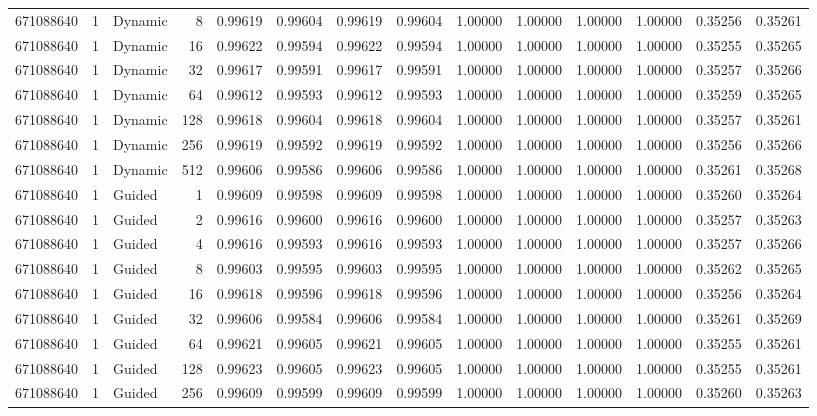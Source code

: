 \begin{tabular}{rrlrrrrrrrrrrr}
671088640 & 1 & Dynamic & 8 & 0.99619 & 0.99604 & 0.99619 & 0.99604 & 1.00000 & 1.00000 & 1.00000 & 1.00000 & 0.35256 & 0.35261 \\
671088640 & 1 & Dynamic & 16 & 0.99622 & 0.99594 & 0.99622 & 0.99594 & 1.00000 & 1.00000 & 1.00000 & 1.00000 & 0.35255 & 0.35265 \\
671088640 & 1 & Dynamic & 32 & 0.99617 & 0.99591 & 0.99617 & 0.99591 & 1.00000 & 1.00000 & 1.00000 & 1.00000 & 0.35257 & 0.35266 \\
671088640 & 1 & Dynamic & 64 & 0.99612 & 0.99593 & 0.99612 & 0.99593 & 1.00000 & 1.00000 & 1.00000 & 1.00000 & 0.35259 & 0.35265 \\
671088640 & 1 & Dynamic & 128 & 0.99618 & 0.99604 & 0.99618 & 0.99604 & 1.00000 & 1.00000 & 1.00000 & 1.00000 & 0.35257 & 0.35261 \\
671088640 & 1 & Dynamic & 256 & 0.99619 & 0.99592 & 0.99619 & 0.99592 & 1.00000 & 1.00000 & 1.00000 & 1.00000 & 0.35256 & 0.35266 \\
671088640 & 1 & Dynamic & 512 & 0.99606 & 0.99586 & 0.99606 & 0.99586 & 1.00000 & 1.00000 & 1.00000 & 1.00000 & 0.35261 & 0.35268 \\
671088640 & 1 & Guided & 1 & 0.99609 & 0.99598 & 0.99609 & 0.99598 & 1.00000 & 1.00000 & 1.00000 & 1.00000 & 0.35260 & 0.35264 \\
671088640 & 1 & Guided & 2 & 0.99616 & 0.99600 & 0.99616 & 0.99600 & 1.00000 & 1.00000 & 1.00000 & 1.00000 & 0.35257 & 0.35263 \\
671088640 & 1 & Guided & 4 & 0.99616 & 0.99593 & 0.99616 & 0.99593 & 1.00000 & 1.00000 & 1.00000 & 1.00000 & 0.35257 & 0.35266 \\
671088640 & 1 & Guided & 8 & 0.99603 & 0.99595 & 0.99603 & 0.99595 & 1.00000 & 1.00000 & 1.00000 & 1.00000 & 0.35262 & 0.35265 \\
671088640 & 1 & Guided & 16 & 0.99618 & 0.99596 & 0.99618 & 0.99596 & 1.00000 & 1.00000 & 1.00000 & 1.00000 & 0.35256 & 0.35264 \\
671088640 & 1 & Guided & 32 & 0.99606 & 0.99584 & 0.99606 & 0.99584 & 1.00000 & 1.00000 & 1.00000 & 1.00000 & 0.35261 & 0.35269 \\
671088640 & 1 & Guided & 64 & 0.99621 & 0.99605 & 0.99621 & 0.99605 & 1.00000 & 1.00000 & 1.00000 & 1.00000 & 0.35255 & 0.35261 \\
671088640 & 1 & Guided & 128 & 0.99623 & 0.99605 & 0.99623 & 0.99605 & 1.00000 & 1.00000 & 1.00000 & 1.00000 & 0.35255 & 0.35261 \\
671088640 & 1 & Guided & 256 & 0.99609 & 0.99599 & 0.99609 & 0.99599 & 1.00000 & 1.00000 & 1.00000 & 1.00000 & 0.35260 & 0.35263 \\

\end{tabular}
